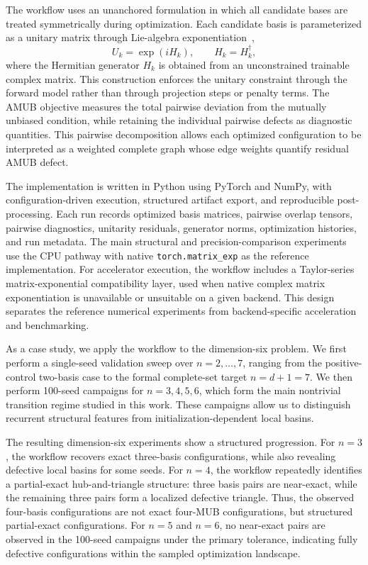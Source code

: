 \documentclass[a4paper,twocolumn,11pt,amsfonts,amssymb]{quantumarticle}
\begin{document}
The workflow uses an unanchored formulation in which all candidate bases are treated symmetrically during optimization. Each candidate basis is parameterized as a unitary matrix through Lie-algebra exponentiation~\cite{elena2000ApproxLieAlgerba},
\[
U_k = \exp(iH_k), \qquad H_k = H_k^\dagger,
\]
where the Hermitian generator \(H_k\) is obtained from an unconstrained trainable complex matrix. This construction enforces the unitary constraint through the forward model rather than through projection steps or penalty terms. The AMUB objective measures the total pairwise deviation from the mutually unbiased condition, while retaining the individual pairwise defects as diagnostic quantities. This pairwise decomposition allows each optimized configuration to be interpreted as a weighted complete graph whose edge weights quantify residual AMUB defect.

The implementation is written in Python using PyTorch and NumPy, with configuration-driven execution, structured artifact export, and reproducible post-processing. Each run records optimized basis matrices, pairwise overlap tensors, pairwise diagnostics, unitarity residuals, generator norms, optimization histories, and run metadata. The main structural and precision-comparison experiments use the CPU pathway with native \texttt{torch.matrix\_exp} as the reference implementation. For accelerator execution, the workflow includes a Taylor-series matrix-exponential compatibility layer, used when native complex matrix exponentiation is unavailable or unsuitable on a given backend. This design separates the reference numerical experiments from backend-specific acceleration and benchmarking.

As a case study, we apply the workflow to the dimension-six problem. We first perform a single-seed validation sweep over \(n=2,\ldots,7\), ranging from the positive-control two-basis case to the formal complete-set target \(n=d+1=7\). We then perform 100-seed campaigns for \(n=3,4,5,6\), which form the main nontrivial transition regime studied in this work. These campaigns allow us to distinguish recurrent structural features from initialization-dependent local basins.

The resulting dimension-six experiments show a structured progression. For \(n=3\), the workflow recovers exact three-basis configurations, while also revealing defective local basins for some seeds. For \(n=4\), the workflow repeatedly identifies a partial-exact hub-and-triangle structure: three basis pairs are near-exact, while the remaining three pairs form a localized defective triangle. Thus, the observed four-basis configurations are not exact four-MUB configurations, but structured partial-exact configurations. For \(n=5\) and \(n=6\), no near-exact pairs are observed in the 100-seed campaigns under the primary tolerance, indicating fully defective configurations within the sampled optimization landscape.
\end{document}
